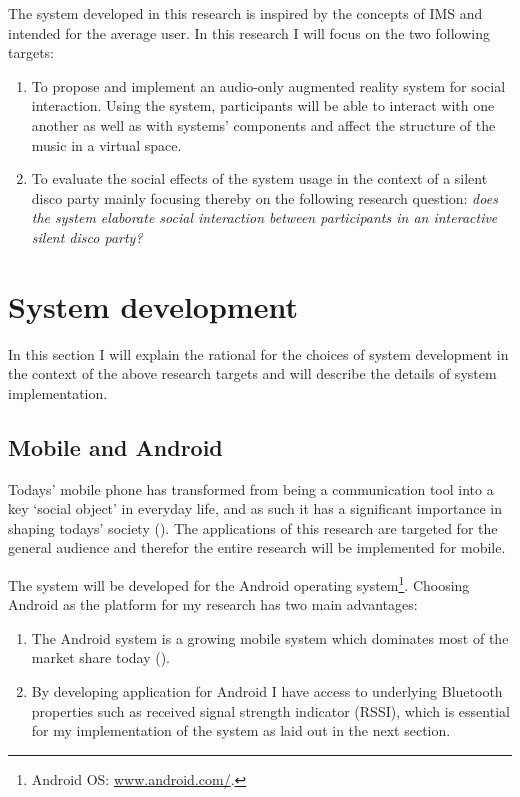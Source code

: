 \documentclass[a4paper,11pt]{article}
\begin{document}
The system developed in this research is inspired by the concepts of IMS and intended for the average user. In this research I will focus on the two following targets:
\begin{enumerate}
	\item To propose and implement an audio-only augmented reality system for social interaction.
	Using the system, participants will be able to interact with one another as well as with systems' components and affect the structure of the music in a virtual space.
	\item To evaluate the social effects of the system usage in the context of a silent disco party mainly focusing thereby on the following research question: \emph{does the system elaborate social interaction between participants in an interactive silent disco party?}
\end{enumerate}

\section{System development}

In this section I will explain the rational for the choices of system development in the context of the above research targets and will describe the details of system implementation.

\subsection{Mobile and Android}

Todays' mobile phone has transformed from being a communication tool into a key `social object' in everyday life, and as such it has a significant importance in shaping todays' society (\cite{srivastava05}).
The applications of this research are targeted for the general audience and therefor the entire research will be implemented for mobile.

The system will be developed for the Android operating system\footnote{Android OS: \href{http://www.android.com/}{www.android.com/}.}.
Choosing Android as the platform for my research has two main advantages:
\begin{enumerate}
	\item The Android system is a growing mobile system which dominates most of the market share today (\cite{web:idc}).
	\item By developing application for Android I have access to underlying Bluetooth properties such as received signal strength indicator (RSSI), which is essential for my implementation of the system as laid out in the next section.
\end{enumerate}
\end{document}
